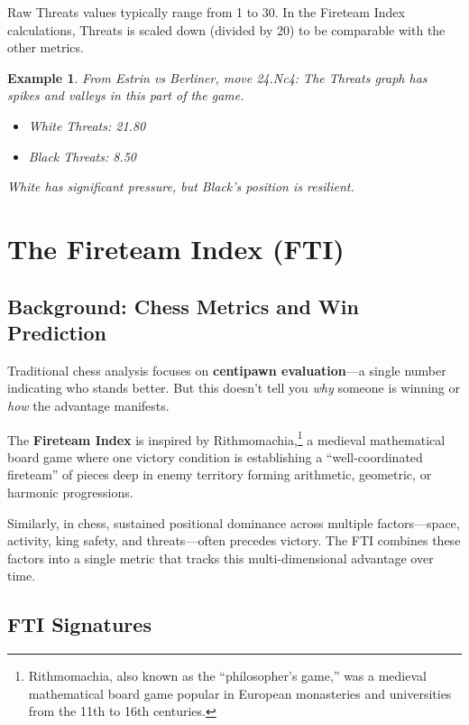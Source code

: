 \documentclass[12pt]{book}
\newtheorem{example}{Example}[section]
\begin{document}
Raw Threats values typically range from 1 to 30. In the Fireteam Index calculations, Threats is scaled down (divided by 20) to be comparable with the other metrics.

\begin{example} From Estrin vs Berliner, move 24.Nc4: The Threats graph
  has spikes and valleys in this part of the game.
\begin{itemize}
    \item White Threats: 21.80
    \item Black Threats: 8.50
\end{itemize}
White has significant pressure, but Black's position is resilient.
\end{example}

\section{The Fireteam Index (FTI)}

\subsection{Background: Chess Metrics and Win Prediction}

Traditional chess analysis focuses on \textbf{centipawn evaluation}---a single number indicating who stands better. But this doesn't tell you \emph{why} someone is winning or \emph{how} the advantage manifests.

The \textbf{Fireteam Index} is inspired by Rithmomachia,\footnote{Rithmomachia, also known as the ``philosopher's game,'' was a medieval mathematical board game popular in European monasteries and universities from the 11th to 16th centuries.} a medieval mathematical board game where one victory condition is establishing a ``well-coordinated fireteam'' of pieces deep in enemy territory forming arithmetic, geometric, or harmonic progressions.

Similarly, in chess, sustained positional dominance across multiple factors---space, activity, king safety, and threats---often precedes victory. The FTI combines these factors into a single metric that tracks this multi-dimensional advantage over time.

\subsection{FTI Signatures}
\end{document}
